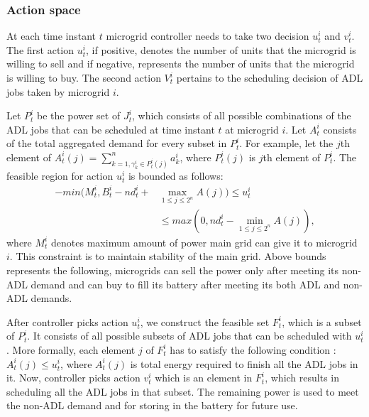 \subsubsection{Action space}
At each time instant $t$ microgrid controller needs to take two decision $u_{t}^{i}$ and $v_{t}^{i}$. The first action $u_{t}^{i}$, if positive, denotes the number of units that the microgrid is willing to sell and if negative, represents the number of units that the microgrid is willing to buy. The second action $V_{t}^{i}$ pertains to the scheduling decision of ADL jobs taken by microgrid $i$.

Let $P_{t}^{i}$ be the power set of $J_{t}^{i}$, which consists of all possible combinations of the ADL jobs that can be scheduled at time instant $t$ at microgrid $i$. Let  $A_{t}^{i}$ consists of the total aggregated demand  for every subset in  $P_{t}^{i}$. For example, let the $j$th element of $A_{t}^{i}(j) = \sum_{k=1, \gamma_k^i \in P_{t}^{i}(j) }^n a_k^i$, where $ P_{t}^{i}(j)$ is $j$th element of  $P_{t}^{i}$.
 The feasible region for action $u_{t}^{i}$ is bounded as follows:
\begin{align}
-min(M_t^i, B_t^i - nd_t^i + &\max_{1\leq j \leq 2^n} A(j) ) \leq u_t^i \nonumber\\ &\leq max(0, nd_t^i - \min_{1\leq j \leq 2^n} A(j)),
\end{align}
where $M_t^i$ denotes maximum amount of power main grid can give it to microgrid $i$. This constraint is to maintain stability of the main grid. Above bounds represents the following, microgrids can sell the power only after meeting its non-ADL demand and can buy to fill its battery after meeting its both ADL and non-ADL demands.

After controller picks action $u_{t}^{i}$, we construct the feasible set $F_{t}^{i}$, which is a subset of $P_{t}^{i}$. It consists of all possible subsets of ADL jobs that can be scheduled with $u_{t}^{i}$. More formally, each element $j$ of  $F_{t}^{i}$ has to satisfy the following condition :   $A_t^i(j) \leq u_{t}^{i} $, where $A_t^i(j)$ is total energy required to finish all the ADL jobs in it. Now, controller picks action $v_{t}^{i}$ which is an element in $F_{t}^{i}$, which results in scheduling all the ADL jobs in that subset. The remaining power is used to meet the non-ADL demand and for storing in the battery for future use.

